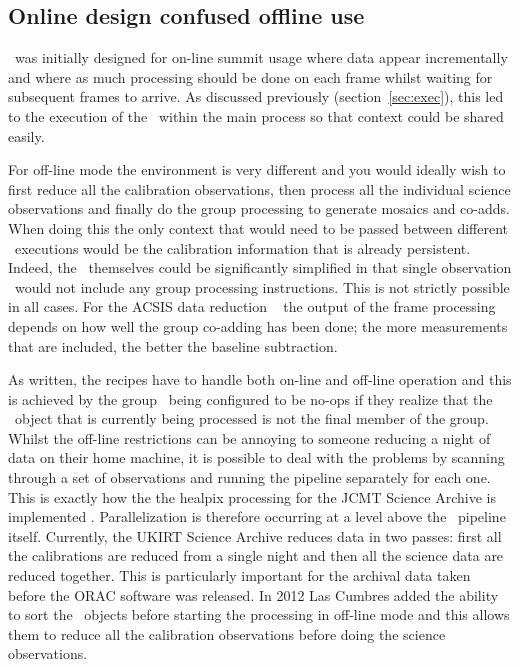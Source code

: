 \documentclass[final,authoryear,5p,times,twocolumn]{elsarticle}
\begin{document}
\subsection{Online design confused offline use}
\label{sec:onvoff}

\oracdr\ was initially designed for on-line summit usage where data
appear incrementally and where as much processing should be done on
each frame whilst waiting for subsequent frames to arrive. As
discussed previously (section~\ref{sec:exec}), this led to the
execution of the \recipe\ within the main process so that context
could be shared easily.

For off-line mode the environment is very different and you would
ideally wish to first reduce all the calibration observations, then
process all the individual science observations and finally do the
group processing to generate mosaics and co-adds. When doing this the
only context that would need to be passed between different \recipe\
executions would be the calibration information that is already
persistent. Indeed, the \recipes\ themselves could be significantly
simplified in that single observation \recipes\ would not include any
group processing instructions. This is not strictly possible in all
cases. For the ACSIS data reduction \recipes\ \citep{JennessACSISDR}
the output of the frame processing depends on how well the group
co-adding has been done; the more measurements that are included, the
better the baseline subtraction.

As written, the recipes have to handle both on-line and off-line
operation and this is achieved by the group \primitives\ being
configured to be no-ops if they realize that the \Frame\ object that
is currently being processed is not the final member of the group.
Whilst the off-line restrictions can be annoying to someone reducing a
night of data on their home machine, it is possible to deal with the
problems by scanning through a set of observations and running the
pipeline separately for each one. This is exactly how the the healpix
processing for the JCMT Science Archive is implemented
\citep{2014SPIE9152-93}. Parallelization is therefore occurring at a
level above the \oracdr\ pipeline itself. Currently, the UKIRT Science
Archive \citep{2014ASPC..485..143B} reduces data in two passes: first
all the calibrations are reduced from a single night and then all the
science data are reduced together. This is particularly important for
the archival data taken before the ORAC software was released.
In 2012 Las Cumbres added the ability to sort the \Group\ objects
before starting the processing in off-line mode and this allows them to
reduce all the calibration observations before doing the science
observations.
\end{document}
